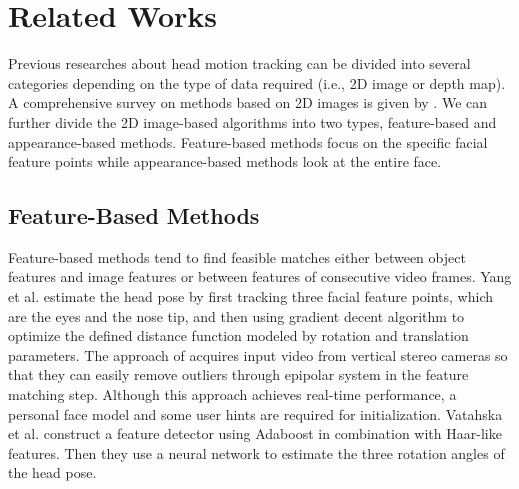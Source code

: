 \chapter{Related Works}
\label{c:related}

Previous researches about head motion tracking can be divided into several categories depending on the type of data required (i.e., 2D image or depth map). A comprehensive survey on methods based on 2D images is given by \cite{Murphy:09:SURVEY}. We can further divide the 2D image-based algorithms into two types, feature-based \cite{Yang:02:MBHPTWS,Vatahska:07:FBHPEFI,Matsumoto:00:AAFRTSVIOHPAGDM,Yao:04:EMBLHMRFM,Whitehill:08:ADATFBFHPT} and appearance-based \cite{Morency:03:PEU3VBE,Balasubramanian:07:BMEAFFPIHPE,Osadchy:07:SFDPEEBM,Storer:09:3DMAM,Chen:03:HPEUFML,Whitehill:08:ADATFBFHPT} methods. Feature-based methods focus on the specific facial feature points while appearance-based methods look at the entire face.

\section{Feature-Based Methods}
Feature-based methods tend to find feasible matches either between object features and image features or between features of consecutive video frames. Yang et al. \cite{Yang:99:USP} estimate the head pose by first tracking three facial feature points, which are the eyes and the nose tip, and then using gradient decent algorithm to optimize the defined distance function modeled by rotation and translation parameters. The approach of \cite{Yang:02:MBHPTWS} acquires input video from vertical stereo cameras so that they can easily remove outliers through epipolar system in the feature matching step. Although this approach achieves real-time performance, a personal face model and some user hints are required for initialization. Vatahska et al. \cite{Vatahska:07:FBHPEFI} construct a feature detector using Adaboost in combination with Haar-like features. Then they use a neural network to estimate the three rotation angles of the head pose.

